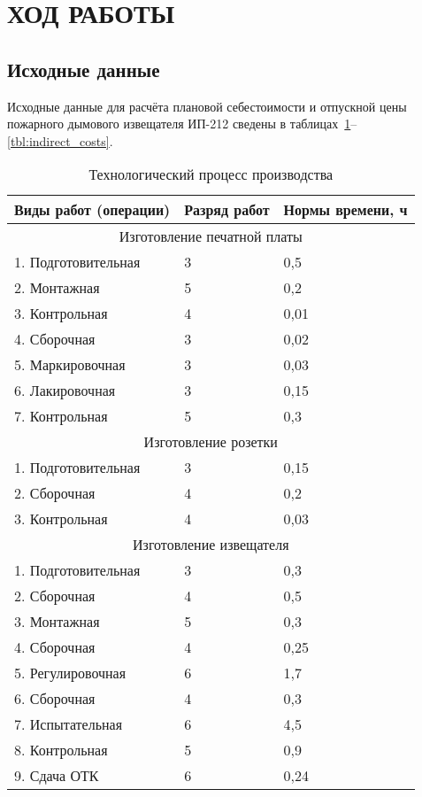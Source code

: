 \section{ХОД РАБОТЫ}

\subsection{Исходные данные}

Исходные данные для расчёта плановой себестоимости и отпускной цены пожарного
дымового извещателя ИП-212 сведены в
таблицах~\ref{tbl:technological_process}--\ref{tbl:indirect_costs}.

\begin{table}[h!]
  \caption{Технологический процесс производства}
  \label{tbl:technological_process}
  \centering
  \small{
    \begin{tabular}{| p{} | p{} | p{} |}
      \hline

      Виды работ (операции) & Разряд работ & Нормы времени, ч \\ \hline

      \multicolumn{3}{|c|}{Изготовление печатной платы} \\ \hline
      1. Подготовительная & 3 & 0,5  \\ \hline
      2. Монтажная        & 5 & 0,2  \\ \hline
      3. Контрольная      & 4 & 0,01 \\ \hline
      4. Сборочная        & 3 & 0,02 \\ \hline
      5. Маркировочная    & 3 & 0,03 \\ \hline
      6. Лакировочная     & 3 & 0,15 \\ \hline
      7. Контрольная      & 5 & 0,3  \\ \hline

      \multicolumn{3}{|c|}{Изготовление розетки} \\ \hline
      1. Подготовительная & 3 & 0,15 \\ \hline
      2. Сборочная        & 4 & 0,2  \\ \hline
      3. Контрольная      & 4 & 0,03 \\ \hline

      \multicolumn{3}{|c|}{Изготовление извещателя} \\ \hline
      1. Подготовительная & 3 & 0,3  \\ \hline
      2. Сборочная        & 4 & 0,5  \\ \hline
      3. Монтажная        & 5 & 0,3  \\ \hline
      4. Сборочная        & 4 & 0,25 \\ \hline
      5. Регулировочная   & 6 & 1,7  \\ \hline
      6. Сборочная        & 4 & 0,3  \\ \hline
      7. Испытательная    & 6 & 4,5  \\ \hline
      8. Контрольная      & 5 & 0,9  \\ \hline
      9. Сдача ОТК        & 6 & 0,24 \\ \hline


\end{tabular}}
\end{table}
